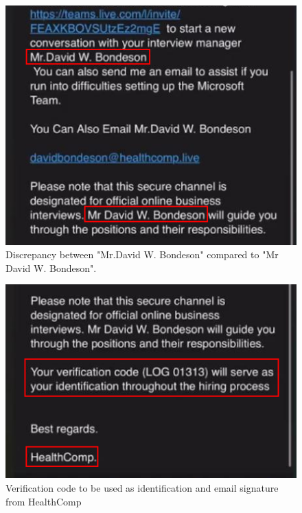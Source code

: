 \begin{fullwidth}
    \begin{figure}[H] %
        \label{sec:Fig14}
        \centering
        \includegraphics[width=.9\linewidth]{assets/titleerror.png}
        \captionsetup{justification=centering}
        \caption{Discrepancy between "Mr.David W. Bondeson" compared to "Mr David W. Bondeson".}
    \end{figure}

    \begin{figure}[H] %
        \label{sec:Fig15}
        \centering
        \includegraphics[width=.9\linewidth]{assets/VerificationCode.png}
        \captionsetup{justification=centering}
        \caption{Verification code to be used as identification and email signature from HealthComp}
    \end{figure}


\end{fullwidth}
